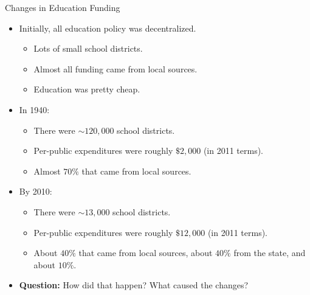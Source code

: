\documentclass{beamer}
\begin{document}
\begin{frame}{Changes in Education Funding}
\begin{itemize}
\item Initially, all education policy was decentralized. 
	\begin{itemize}
	\item Lots of small school districts. 
	\item Almost all funding came from local sources. 
	\item Education was pretty cheap.
	\end{itemize}
\item In 1940:
	\begin{itemize}
	\item There were $\sim 120,000$ school districts.
	\item Per-public expenditures were roughly $\$2,000$ (in 2011 terms).
	\item Almost $70\%$ that came from local sources.
	\end{itemize}
\item By 2010:
	\begin{itemize}
	\item There were $\sim 13,000$ school districts.
	\item Per-public expenditures were roughly $\$12,000$ (in 2011 terms).
	\item About $40\%$ that came from local sources, about $40\%$ from the state, and about $10\%$.
	\end{itemize}
\pause
\item \textbf{Question:} How did that happen? What caused the changes?
\end{itemize}
\end{frame}
\end{document}
